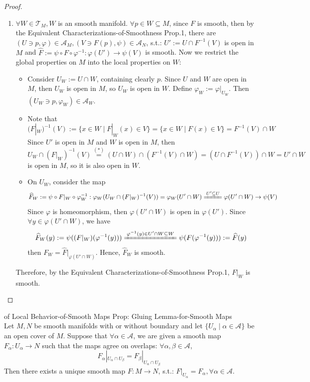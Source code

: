 \begin{proof}
\begin{enumerate}
        \item $\forall W\in \mathcal{T}_M, W$ is an smooth manifold. $\forall p\in W\subseteq M$, since $F$ is smooth, then by the Equivalent Characterizations-of-Smoothness Prop.1, there are $(U\ni p,\varphi) \in \mathcal{A}_M, (V\ni F(p), \psi) \in \mathcal{A}_N$, s.t.: $U':= U\cap F^{-1}(V)$ is open in $M$ and $\widehat{F}:= \psi \circ F\circ \varphi^{-1}: \varphi(U')\to \psi(V)$ is smooth. Now we restrict the global properties on $M$ into the local properties on $W$:
        \begin{itemize}
            \item Consider $U_W:= U\cap W$, containing clearly $p$. Since $U$ and $W$ are open in $M$, then $U_W$ is open in $M$, so $U_W$ is open in $W$. Define $\varphi_W:= \varphi|_{U_W}$. Then $(U_W \ni p, \varphi_W)\in \mathcal{A}_W$.
            \item Note that
            \begin{equation*}
                (F|_W)^{-1} (V):= \{x\in W\mid F|_{W}(x) \in V\}= \{x\in W\mid  F(x)\in V\} = F^{-1}(V) \cap W \tag{*}
            \end{equation*}
            Since $U'$ is open in $M$ and $W$ is open in $M$, then
            \[
            U_W \cap (F|_W)^{-1} (V) \overset{(*)}{=} (U \cap W) \cap (F^{-1} (V) \cap W) = (U\cap F^{-1} (V)) \cap W= U'\cap W
            \]
            is open in $M$, so it is also open in $W$.
            \item On $U_W$, consider the map
            \[
            \widehat{F}_W:= \psi \circ F|_W \circ \varphi^{-1}_W: \varphi_W(U_W \cap (F|_W)^{-1} (V))= \varphi_W(U'\cap W) \xlongequal{U' \subseteq U} \varphi (U'\cap W) \to \psi(V)
            \]
            Since $\varphi$ is homeomorphism, then $\varphi(U' \cap W)$ is open in $\varphi(U')$. Since $\forall y\in \varphi(U' \cap W)$, we have
            \[
            \widehat{F} _W(y):= \psi((F|_W)(\varphi^{-1} (y))) \xlongequal{\varphi^{-1} (y) \in U'\cap W\subseteq W} \psi(F(\varphi^{-1}(y))) := \widehat{F}(y)
            \]
            then $\widehat{F}_W= \widehat{F}|_{\varphi(U'\cap W)}$. Hence, $\widehat{F}_W$ is smooth.
        \end{itemize}
        Therefore, by the Equivalent Characterizations-of-Smoothness Prop.1, $F|_W$ is smooth.
    \end{enumerate}
\end{proof}

\begin{corollary}{of Local Behavior-of-Smooth Maps Prop: Gluing Lemma-for-Smooth Maps}\\
Let $M,N$ be smooth manifolds with or without boundary and let $\{U_\alpha \mid \alpha\in \mathcal{A}\}$ be an open cover of $M$. Suppose that $\forall \alpha\in \mathcal{A}$, we are given a smooth map $F_\alpha:U_\alpha\to N$ such that the maps agree on overlaps: $\forall \alpha, \beta\in \mathcal{A}$, 
\[
F_\alpha|_{U_\alpha \cap U_\beta}= F_\beta|_{U_\alpha \cap U_\beta}
\]
Then there exists a unique smooth map $F: M\to N$, s.t.: $F|_{U_\alpha}= F_\alpha, \forall \alpha \in \mathcal{A}$.
\end{corollary}

